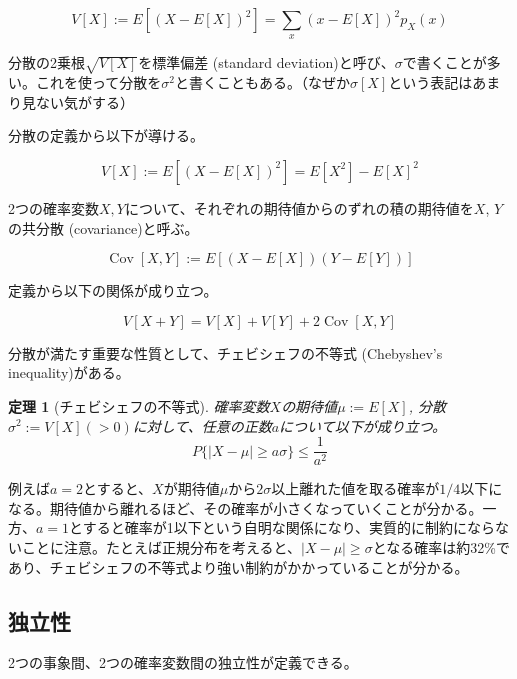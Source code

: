 \documentclass[uplatex,dvipdfmx]{jlreq}
\newcommand\term[1]{\textsf{#1}}
\newtheorem{theorem}{定理}
\begin{document}
\begin{equation}
    V[X] := E[(X-E[X])^2] = \sum_x (x-E[X])^2 p_X(x)
\end{equation}

分散の2乗根$\sqrt{V[X]}$を\term{標準偏差 (standard deviation)}と呼び、$\sigma$で書くことが多い。これを使って分散を$\sigma^2$と書くこともある。（なぜか$\sigma[X]$という表記はあまり見ない気がする）

分散の定義から以下が導ける。

\begin{equation}
    V[X] := E[(X-E[X])^2] = E[X^2] - E[X]^2
\end{equation}

2つの確率変数$X, Y$について、それぞれの期待値からのずれの積の期待値を$X$, $Y$の\term{共分散 (covariance)}と呼ぶ。

\begin{equation}
    \operatorname{Cov}[X, Y] :=
    E[(X-E[X])(Y-E[Y])]
\end{equation}

定義から以下の関係が成り立つ。

\begin{equation}
    V[X + Y] = V[X] + V[Y] + 2\operatorname{Cov}[X, Y]
\end{equation}

分散が満たす重要な性質として、\term{チェビシェフの不等式 (Chebyshev's inequality)}がある。

\begin{theorem}[チェビシェフの不等式]
    確率変数$X$の期待値$\mu:=E[X]$, 分散$\sigma^2:=V[X] (>0)$に対して、任意の正数$a$について以下が成り立つ。
    \begin{equation}
        P\{|X - \mu| \geq a\sigma\} \leq \frac{1}{a^2}
    \end{equation}
\end{theorem}

例えば$a=2$とすると、$X$が期待値$\mu$から$2\sigma$以上離れた値を取る確率が$1/4$以下になる。期待値から離れるほど、その確率が小さくなっていくことが分かる。一方、$a=1$とすると確率が1以下という自明な関係になり、実質的に制約にならないことに注意。たとえば正規分布を考えると、$|X-\mu|\geq\sigma$となる確率は約32\%であり、チェビシェフの不等式より強い制約がかかっていることが分かる。

\subsection{独立性}

2つの事象間、2つの確率変数間の独立性が定義できる。
\end{document}
